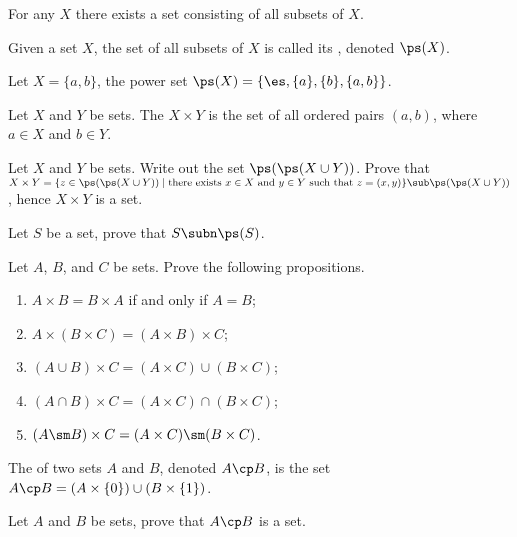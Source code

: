\documentclass[10pt]{article}
\begin{document}
\begin{Axiom of power set}
    For any $X$ there exists a set consisting of all subsets of $X$.
\end{Axiom of power set}
\begin{definition}
    Given a set $X$, the set of all subsets of $X$ is called its , denoted $\ps(X)$.
\end{definition}
\begin{example}
    Let $X=\{a,b\}$, the power set $\ps(X)=\{\es,\{a\},\{b\},\{a,b\}\}$.
\end{example}
\begin{definition}
    Let $X$ and $Y$ be sets. The  $X\times Y$ is the set of all ordered pairs $(a,b)$, where $a\in X$ and $b\in Y$.
\end{definition}
\begin{problem}
    Let $X$ and $Y$ be sets. Write out the set $\ps(\ps(X\cup Y))$. Prove that $X\times Y=\{z\in\ps(\ps(X\cup Y))\mid\text{there exists}\ x\in X\ \text{and}\ y\in Y\ \text{such that}\ z=(x,y)\}\sub\ps(\ps(X\cup Y))$, hence $X\times Y$ is a set.
\end{problem}
\begin{problem}
    Let $S$ be a set, prove that $S\subn\ps(S)$. 
\end{problem}
\begin{problem}
    Let $A$, $B$, and $C$ be sets. Prove the following propositions.
    \begin{enumerate}
        \item $A\times B=B\times A$ if and only if $A=B$;
        \item $A\times(B\times C)=(A\times B)\times C$;
        \item $(A\cup B)\times C=(A\times C)\cup(B\times C)$;
        \item $(A\cap B)\times C=(A\times C)\cap(B\times C)$;
        \item $(A\sm B)\times C=(A\times C)\sm(B\times C)$.
    \end{enumerate}
\end{problem}
\begin{definition}
    The  of two sets $A$ and $B$, denoted $A\cp B$, is the set $A\cp B=(A\times\{0\})\cup(B\times\{1\})$.
\end{definition}
\begin{problem}
    Let $A$ and $B$ be sets, prove that $A\cp B$ is a set.
\end{problem}
\end{document}
